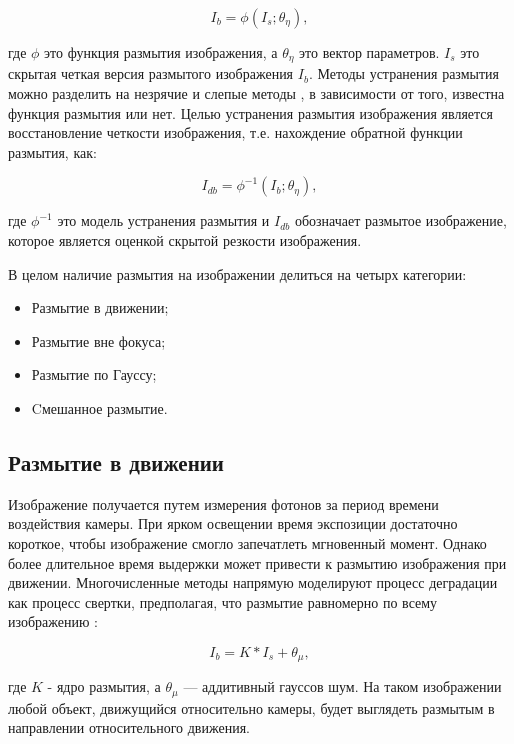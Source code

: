 \begin{equation}
	I_{b} = \phi(I_{s}; \theta_{\eta}),
\end{equation}


где \(\phi\) это функция размытия изображения, а \(\theta_{\eta}\) это вектор параметров. \(I_{s}\) это скрытая четкая версия размытого изображения \(I_{b}\). Методы устранения размытия можно разделить на незрячие и слепые методы \cite{zhang2022deep}, в зависимости от того, известна функция размытия или нет. Целью устранения размытия изображения является восстановление четкости изображения, т.е. нахождение обратной функции размытия, как:

\begin{equation}
	I_{db} = \phi^{-1}(I_{b}; \theta_{\eta}),
\end{equation}


где \(\phi^{-1}\) это модель устранения размытия и \(I_{db}\) обозначает размытое изображение, которое является оценкой скрытой резкости изображения.

В целом наличие размытия на изображении делиться на четырх категории:

\begin{itemize}
	\item Размытие в движении;
	\item Размытие вне фокуса;
	\item Размытие по Гауссу;
	\item Cмешанное размытие.
\end{itemize}

\subsection{Размытие в движении}

Изображение получается путем измерения фотонов за период времени воздействия камеры. При ярком освещении время экспозиции достаточно короткое, чтобы изображение смогло запечатлеть мгновенный момент. Однако более длительное время выдержки может привести к размытию изображения при движении. Многочисленные методы напрямую моделируют процесс деградации как процесс свертки, предполагая, что размытие равномерно по всему изображению \cite{gao2019dynamic}:

\begin{equation}
	I_{b} = K * I_{s} + \theta_{\mu},
\end{equation}

где \(K\) - ядро размытия, а \(\theta_{\mu}\) — аддитивный гауссов шум. На таком изображении любой объект, движущийся относительно камеры, будет выглядеть размытым в направлении относительного движения.

